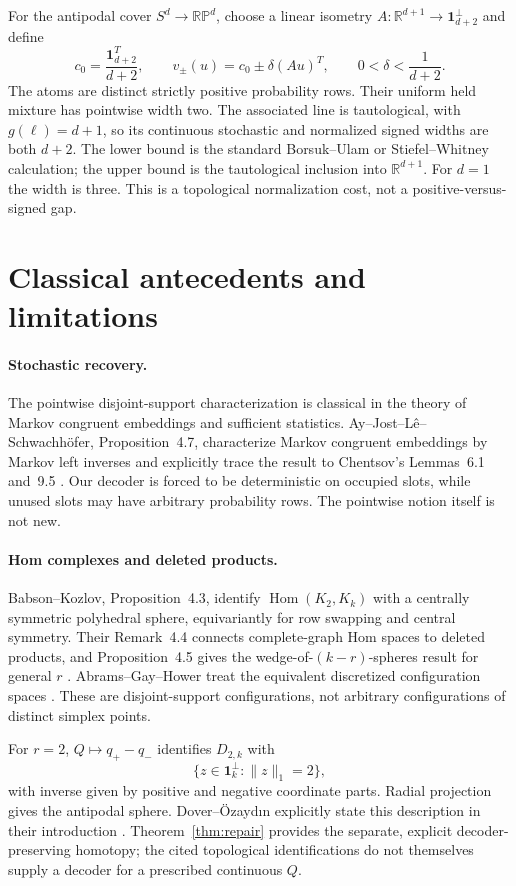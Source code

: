 \documentclass[11pt]{article}
\theoremstyle{definition}
\newcommand{\R}{\mathbb R}
\newcommand{\one}{\mathbf 1}
\newcommand{\Hom}{\operatorname{Hom}}
\newcommand{\RP}{\mathbb {RP}}
\begin{document}
For the antipodal cover $S^d\to\RP^d$, choose a linear isometry $A:\R^{d+1}\to\one_{d+2}^{\perp}$ and define
\[
 c_0=\frac{\one_{d+2}^T}{d+2},\qquad
 v_\pm(u)=c_0\pm\delta(Au)^T,\qquad
 0<\delta<\frac1{d+2}.
\]
The atoms are distinct strictly positive probability rows. Their uniform held mixture has pointwise width two. The associated line is tautological, with $g(\ell)=d+1$, so its continuous stochastic and normalized signed widths are both $d+2$. The lower bound is the standard Borsuk--Ulam or Stiefel--Whitney calculation; the upper bound is the tautological inclusion into $\R^{d+1}$. For $d=1$ the width is three. This is a topological normalization cost, not a positive-versus-signed gap.

\section{Classical antecedents and limitations}
\paragraph{Stochastic recovery.}
The pointwise disjoint-support characterization is classical in the theory of Markov congruent embeddings and sufficient statistics. Ay--Jost--L\^e--Schwachh\"ofer, Proposition~4.7, characterize Markov congruent embeddings by Markov left inverses and explicitly trace the result to Chentsov's Lemmas~6.1 and~9.5 \cite{AJLS}. Our decoder is forced to be deterministic on occupied slots, while unused slots may have arbitrary probability rows. The pointwise notion itself is not new.

\paragraph{Hom complexes and deleted products.}
Babson--Kozlov, Proposition~4.3, identify $\Hom(K_2,K_k)$ with a centrally symmetric polyhedral sphere, equivariantly for row swapping and central symmetry. Their Remark~4.4 connects complete-graph Hom spaces to deleted products, and Proposition~4.5 gives the wedge-of-$(k-r)$-spheres result for general $r$ \cite{BK}. Abrams--Gay--Hower treat the equivalent discretized configuration spaces \cite{AGH}. These are disjoint-support configurations, not arbitrary configurations of distinct simplex points.

For $r=2$, $Q\mapsto q_+-q_-$ identifies $D_{2,k}$ with
\[
 \{z\in\one_k^\perp:\|z\|_1=2\},
\]
with inverse given by positive and negative coordinate parts. Radial projection gives the antipodal sphere. Dover--\"Ozayd\i n explicitly state this description in their introduction \cite{DO}. Theorem~\ref{thm:repair} provides the separate, explicit decoder-preserving homotopy; the cited topological identifications do not themselves supply a decoder for a prescribed continuous $Q$.
\end{document}
